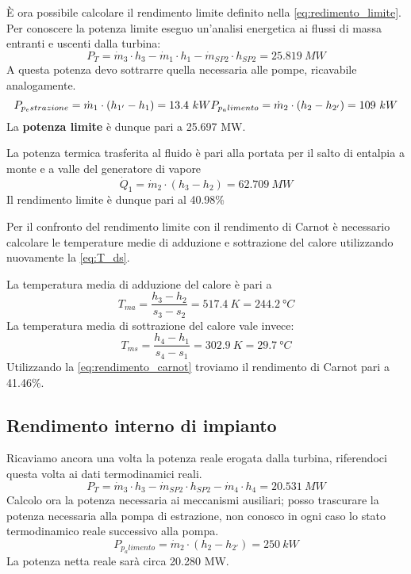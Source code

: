 È ora possibile calcolare il rendimento limite definito nella \eqref{eq:redimento_limite}. Per conoscere la potenza limite eseguo un'analisi energetica
ai flussi di massa entranti e uscenti dalla turbina:
\begin{equation*}
    P_T = \dot m_3 \cdot h_3 - \dot m_1 \cdot h_1 - \dot m_{SP2} \cdot h_{SP2} = 25.819\ MW
\end{equation*}
A questa potenza devo sottrarre quella necessaria alle pompe, ricavabile analogamente.
\begin{equation*}
    P_{p_estrazione} = \dot m_1 \cdot \left( h_{1'} - h_1 \right) = 13.4\ kW \\
    P_{p_alimento} = \dot m_2 \cdot \left( h_2 - h_{2'} \right) = 109\ kW 
\end{equation*}
La \textbf{potenza limite} è dunque pari a 25.697 MW.

La potenza termica trasferita al fluido è pari alla portata per il salto di entalpia a monte e a valle del generatore di vapore
\begin{equation*}
    \dot Q_1 = \dot m_2 \cdot (h_3-h_2) = 62.709\ MW
\end{equation*}
Il rendimento limite è dunque pari al 40.98\%

Per il confronto del rendimento limite con il rendimento di Carnot è necessario calcolare le temperature medie di adduzione e sottrazione del calore
utilizzando nuovamente la \eqref{eq:T_ds}.

La temperatura media di adduzione del calore è pari a
\begin{equation*}
    T_{ma} = \frac{h_3 - h_2}{s_3 - s_2} = 517.4\ K = 244.2\ \text{°}C
\end{equation*}
La temperatura media di sottrazione del calore vale invece:
\begin{equation*}
    T_{ms} = \frac{h_4-h_1}{s_4 - s_1} = 302.9\ K = 29.7\ \text{°}C
\end{equation*}
Utilizzando la \eqref{eq:rendimento_carnot} troviamo il rendimento di Carnot pari a 41.46\%.

\subsection{Rendimento interno di impianto}
Ricaviamo ancora una volta la potenza reale erogata dalla turbina, riferendoci questa volta ai dati termodinamici reali.
\begin{equation*}
    P_T = \dot m_3 \cdot h_3 - \dot m_{SP2} \cdot h_{SP2} - \dot m_4 \cdot h_4 = 20.531\ MW
\end{equation*}
Calcolo ora la potenza necessaria ai meccanismi ausiliari; posso trascurare la potenza necessaria alla pompa di estrazione, non conosco in ogni caso lo stato termodinamico
reale successivo alla pompa.
\begin{equation*}
    P_{p_alimento} = \dot m_2 \cdot \left( h_2 - h_{2'} \right) = 250\ kW 
\end{equation*}
La potenza netta reale sarà circa 20.280 MW.

